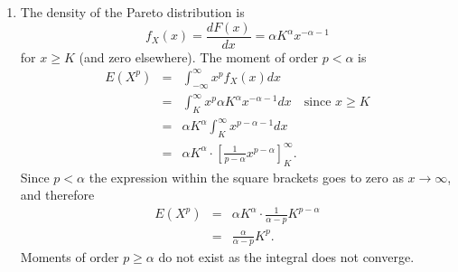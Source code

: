 \begin{Solution}{6.1}
\begin{enumerate}
\item The density of the Pareto distribution is%
\begin{equation*}
f_{X}(x)=\frac{dF(x)}{dx}=\alpha K^\alpha x^{-\alpha -1}
\end{equation*}%
for $x\geq K$ (and zero elsewhere). The moment of order $%
p<\alpha $ is%
\begin{eqnarray*}
E\left( X^{p}\right)  &=&\int_{-\infty }^{\infty }x^{p}f_{X}(x)dx \\
&=&\int_{K}^{\infty }x^{p}\alpha K^\alpha x^{-\alpha -1}dx \quad\text{since } x\geq K\\
&=&\alpha K^\alpha\int_{K}^{\infty }x^{p-\alpha -1}dx \\
&=&\alpha K^\alpha\cdot \left[ \frac{1}{p-\alpha }x^{p-\alpha }\right]
_{K}^{\infty }.
\end{eqnarray*}%
Since $p<\alpha $ the expression within the square brackets goes to zero as $%
x\rightarrow \infty $, and therefore%
\begin{eqnarray*}
E\left( X^{p}\right)  &=&\alpha K^\alpha\cdot \frac{1}{\alpha -p} K^{p-\alpha } \\
&=&\frac{\alpha }{\alpha -p}K^{p}.
\end{eqnarray*}%
Moments of order $p\geq \alpha $ do not exist as the integral does not
converge.
\end{enumerate}
\end{Solution}
